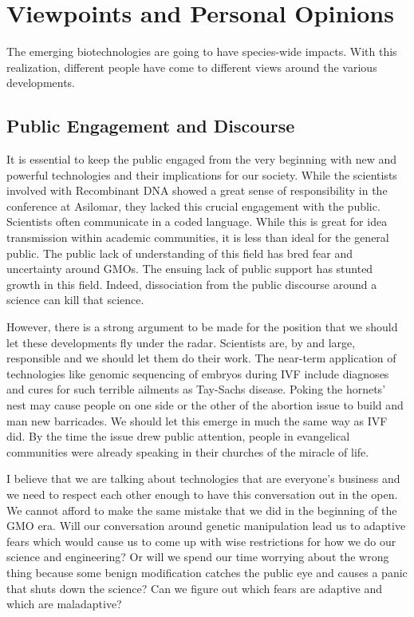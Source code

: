 \section{Viewpoints and Personal Opinions}
\label{sec:viewpoints}

The emerging biotechnologies are going to have species-wide impacts.
With this realization, different people have come to different views around the various developments.

\subsection{Public Engagement and Discourse}

It is essential to keep the public engaged from the very beginning with new and powerful technologies and their implications for our society.
While the scientists involved with Recombinant DNA showed a great sense of responsibility in the conference at Asilomar, they lacked this crucial engagement with the public.
Scientists often communicate in a coded language.
While this is great for idea transmission within academic communities, it is less than ideal for the general public.
The public lack of understanding of this field has bred fear and uncertainty around GMOs.
The ensuing lack of public support has stunted growth in this field.
Indeed, dissociation from the public discourse around a science can kill that science.

However, there is a strong argument to be made for the position that we should let these developments fly under the radar.
Scientists are, by and large, responsible and we should let them do their work.
The near-term application of technologies like genomic sequencing of embryos during IVF include diagnoses and cures for such terrible ailments as Tay-Sachs disease.
Poking the hornets' nest may cause people on one side or the other of the abortion issue to build and man new barricades.
We should let this emerge in much the same way as IVF did.
By the time the issue drew public attention, people in evangelical communities were already speaking in their churches of the miracle of life.

I believe that we are talking about technologies that are everyone's business and we need to respect each other enough to have this conversation out in the open.
We cannot afford to make the same mistake that we did in the beginning of the GMO era.
Will our conversation around genetic manipulation lead us to adaptive fears which would cause us to come up with wise restrictions for how we do our science and engineering?
Or will we spend our time worrying about the wrong thing because some benign modification catches the public eye and causes a panic that shuts down the science?
Can we figure out which fears are adaptive and which are maladaptive?

